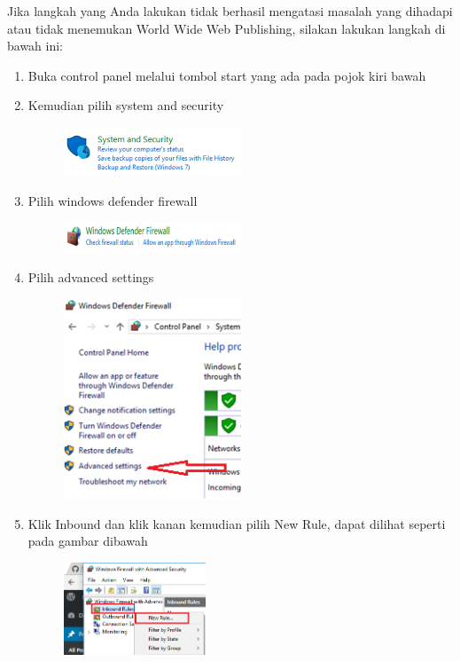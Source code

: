 Jika langkah yang Anda lakukan tidak berhasil mengatasi masalah yang dihadapi atau tidak menemukan World Wide Web Publishing, silakan lakukan langkah di bawah ini:
\begin{enumerate}
    \item Buka control panel melalui tombol start yang ada pada pojok kiri bawah
    
    \item Kemudian pilih system and security
		\begin{figure}[!htbp]
    		\centering
    		\includegraphics[width=0.5\textwidth]{figures/Xampp12.PNG}
    		\label{Xampp12}
		\end{figure}
		
	\item Pilih windows defender firewall
		\begin{figure}[!htbp]
    		\centering
    		\includegraphics[width=0.5\textwidth]{figures/Xampp13.PNG}
    		\label{Xampp13}
		\end{figure}
		
	\item Pilih advanced settings
		\begin{figure}[!htbp]
    		\centering
    		\includegraphics[width=0.5\textwidth]{figures/Xampp14.PNG}
    		\label{Xampp14}
		\end{figure}
		
	\item Klik Inbound dan klik kanan kemudian pilih New Rule, dapat dilihat seperti pada gambar dibawah
		\begin{figure}[!htbp]
    		\centering
    		\includegraphics[width=0.4\textwidth]{figures/Xampp15.png}
    		\label{Xampp15}
		\end{figure}
		

\end{enumerate}
